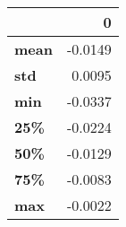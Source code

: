 \begin{tabular}{lr}
\toprule
{} &       0 \\
\midrule
\textbf{mean} & -0.0149 \\
\textbf{std } &  0.0095 \\
\textbf{min } & -0.0337 \\
\textbf{25\% } & -0.0224 \\
\textbf{50\% } & -0.0129 \\
\textbf{75\% } & -0.0083 \\
\textbf{max } & -0.0022 \\
\bottomrule
\end{tabular}
